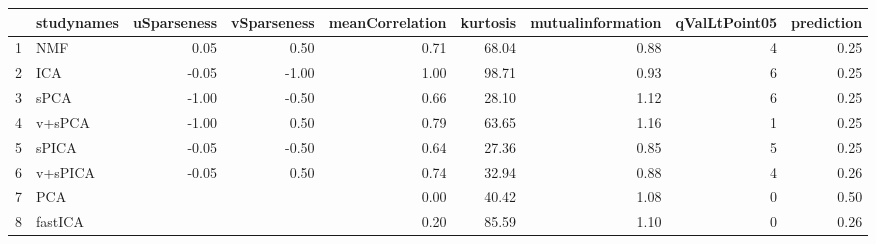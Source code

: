 \begin{tabular}{rlrrrrrrr}
  \toprule
 & studynames & uSparseness & vSparseness & meanCorrelation & kurtosis & mutualinformation & qValLtPoint05 & prediction \\ 
  \midrule
1 & NMF & 0.05 & 0.50 & 0.71 & 68.04 & 0.88 &   4 & 0.25 \\ 
  2 & ICA & -0.05 & -1.00 & 1.00 & 98.71 & 0.93 &   6 & 0.25 \\ 
  3 & sPCA & -1.00 & -0.50 & 0.66 & 28.10 & 1.12 &   6 & 0.25 \\ 
  4 & v+sPCA & -1.00 & 0.50 & 0.79 & 63.65 & 1.16 &   1 & 0.25 \\ 
  5 & sPICA & -0.05 & -0.50 & 0.64 & 27.36 & 0.85 &   5 & 0.25 \\ 
  6 & v+sPICA & -0.05 & 0.50 & 0.74 & 32.94 & 0.88 &   4 & 0.26 \\ 
  7 & PCA &  &  & 0.00 & 40.42 & 1.08 &   0 & 0.50 \\ 
  8 & fastICA &  &  & 0.20 & 85.59 & 1.10 &   0 & 0.26 \\ 
   \bottomrule
\end{tabular}

